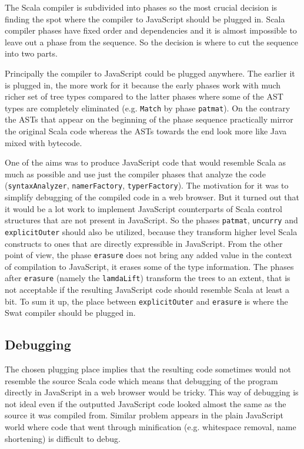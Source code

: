 \documentclass[12pt,a4paper]{report}
\begin{document}
The Scala compiler is subdivided into phases so the most crucial decision is finding the spot where the compiler to JavaScript should be plugged in. Scala compiler phases have fixed order and dependencies and it is almost impossible to leave out a phase from the sequence. So the decision is where to cut the sequence into two parts.

Principally the compiler to JavaScript could be plugged anywhere. The earlier it is plugged in, the more work for it because the early phases work with much richer set of tree types compared to the latter phases where some of the AST types are completely eliminated (e.g. \texttt{Match} by phase \texttt{patmat}). On the contrary the ASTs that appear on the beginning of the phase sequence practically mirror the original Scala code whereas the ASTs towards the end look more like Java mixed with bytecode.

One of the aims was to produce JavaScript code that would resemble Scala as much as possible and use just the compiler phases that analyze the code (\texttt{syntaxAnalyzer}, \texttt{namerFactory}, \texttt{typerFactory}). The motivation for it was to simplify debugging of the compiled code in a web browser. But it turned out that it would be a lot work to implement JavaScript counterparts of Scala control structures that are not present in JavaScript. So the phases \texttt{patmat}, \texttt{uncurry} and \texttt{explicitOuter} should also be utilized, because they transform higher level Scala constructs to ones that are directly expressible in JavaScript. From the other point of view, the phase \texttt{erasure} does not bring any added value in the context of compilation to JavaScript, it erases some of the type information. The phases after \texttt{erasure} (namely the \texttt{lamdaLift}) transform the trees to an extent, that is not acceptable if the resulting JavaScript code should resemble Scala at least a bit. To sum it up, the place between \texttt{explicitOuter} and \texttt{erasure} is where the Swat compiler should be plugged in.

\subsection{Debugging}

The chosen plugging place implies that the resulting code sometimes would not resemble the source Scala code which means that debugging of the program directly in JavaScript in a web browser would be tricky. This way of debugging is not ideal even if the outputted JavaScript code looked almost the same as the source it was compiled from. Similar problem appears in the plain JavaScript world where code that went through minification (e.g. whitespace removal, name shortening) is difficult to debug.
\end{document}
